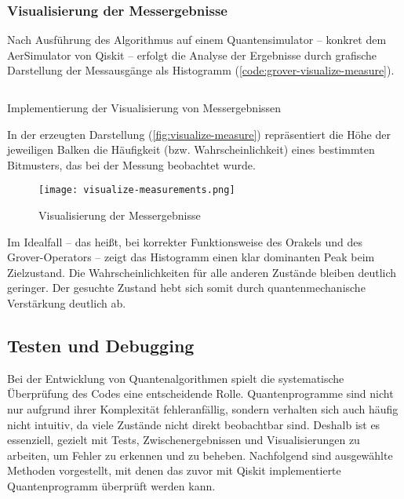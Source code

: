 \subsubsection*{Visualisierung der Messergebnisse}

Nach Ausführung des Algorithmus auf einem Quantensimulator – konkret dem AerSimulator von Qiskit – erfolgt die Analyse der Ergebnisse durch grafische Darstellung der Messausgänge als Histogramm (\autoref{code:grover-visualize-measure}).  

\begin{listing}[ht!]
  \inputminted{python}{code/grover-visualize-measure.py}
  \caption{Implementierung der Visualisierung von Messergebnissen}
  \label{code:grover-visualize-measure}
\end{listing}

In der erzeugten Darstellung (\autoref{fig:visualize-measure}) repräsentiert die Höhe der jeweiligen Balken die Häufigkeit (bzw. Wahrscheinlichkeit) eines bestimmten Bitmusters, das bei der Messung beobachtet wurde.

\begin{figure}
    \centering
    \texttt{[image: visualize-measurements.png]}
    \caption{Visualisierung der Messergebnisse}
    \label{fig:visualize-measure}
\end{figure}

Im Idealfall – das heißt, bei korrekter Funktionsweise des Orakels und des Grover-Operators – zeigt das Histogramm einen klar dominanten Peak beim Zielzustand.  Die Wahrscheinlichkeiten für alle anderen Zustände bleiben deutlich geringer.  Der gesuchte Zustand hebt sich somit durch quantenmechanische Verstärkung deutlich ab.

\subsection{Testen und Debugging}

Bei der Entwicklung von Quantenalgorithmen spielt die systematische Überprüfung des Codes eine entscheidende Rolle. Quantenprogramme sind nicht nur aufgrund ihrer Komplexität fehleranfällig, sondern verhalten sich auch häufig nicht intuitiv, da viele Zustände nicht direkt beobachtbar sind. Deshalb ist es essenziell, gezielt mit Tests, Zwischenergebnissen und Visualisierungen zu arbeiten, um Fehler zu erkennen und zu beheben. Nachfolgend sind ausgewählte Methoden vorgestellt, mit denen das zuvor mit Qiskit implementierte Quantenprogramm überprüft werden kann.


